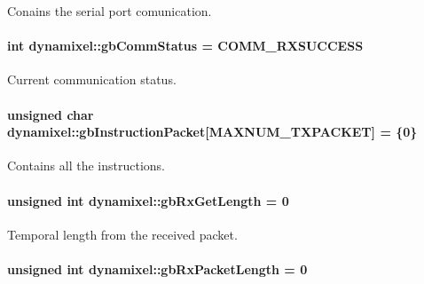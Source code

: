 Conains the serial port comunication. 

\hypertarget{a00004_a5b603f6bed7ccc595f1f50bd6a6ebbfc}{}
\paragraph[{gb\+Comm\+Status}]{\setlength{\rightskip}{0pt plus 5cm}int dynamixel\+::gb\+Comm\+Status = C\+O\+M\+M\+\_\+\+R\+X\+S\+U\+C\+C\+E\+S\+S\hspace{0.3cm}{\ttfamily [private]}}\label{a00004_a5b603f6bed7ccc595f1f50bd6a6ebbfc}


Current communication status. 

\hypertarget{a00004_afd94dcf01b8e96298727776e222de722}{}
\paragraph[{gb\+Instruction\+Packet}]{\setlength{\rightskip}{0pt plus 5cm}unsigned char dynamixel\+::gb\+Instruction\+Packet\mbox{[}M\+A\+X\+N\+U\+M\+\_\+\+T\+X\+P\+A\+C\+K\+E\+T\mbox{]} = \{0\}\hspace{0.3cm}{\ttfamily [private]}}\label{a00004_afd94dcf01b8e96298727776e222de722}


Contains all the instructions. 

\hypertarget{a00004_a9d590ce24791d111c2db9b66be1e046d}{}
\paragraph[{gb\+Rx\+Get\+Length}]{\setlength{\rightskip}{0pt plus 5cm}unsigned int dynamixel\+::gb\+Rx\+Get\+Length = 0\hspace{0.3cm}{\ttfamily [private]}}\label{a00004_a9d590ce24791d111c2db9b66be1e046d}


Temporal length from the received packet. 

\hypertarget{a00004_a333686e1b5903d16c41df8172b6bd5a8}{}
\paragraph[{gb\+Rx\+Packet\+Length}]{\setlength{\rightskip}{0pt plus 5cm}unsigned int dynamixel\+::gb\+Rx\+Packet\+Length = 0\hspace{0.3cm}{\ttfamily [private]}}\label{a00004_a333686e1b5903d16c41df8172b6bd5a8}


